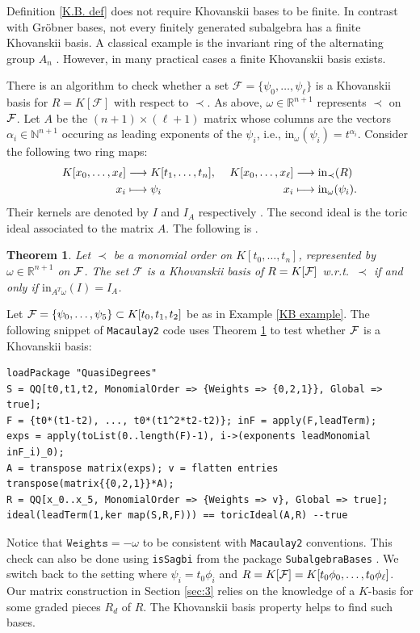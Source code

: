 \documentclass[12pt]{article}
\newtheorem{thm}{Theorem}[section]
\theoremstyle{definition}
\newenvironment{example}
  {\pushQED{\qed}\renewcommand{\qedsymbol}{$\diamond$}\examplex}
  {\popQED\endexamplex}
\theoremstyle{remark}
\newcommand{\numberset}{\mathbb}
\newcommand{\N}{\numberset{N}}
\def\initial{{\mathrm{in}}}
\begin{document}
Definition \ref{K.B. def} does not require Khovanskii bases to be finite. In contrast with Gr\"obner bases, not every finitely generated subalgebra has a finite Khovanskii basis. A classical example is the invariant ring of the alternating group $A_n$ \cite[Example 11.2]{sturmfelsgroebner}. However, in many practical cases a finite Khovanskii basis exists. 

There is an algorithm to check whether a set $\mathcal{F}=\{\psi_0,\ldots, \psi_\ell \}$ is a Khovanskii basis for $R=K[\mathcal{F}]$ with respect to $\prec$. As above, $\omega \in \mathbb{R}^{n+1}$ represents $\prec$ on ${\cal F}$. Let $A$ be the $(n+1) \times (\ell+1)$ matrix whose columns are the vectors $\alpha_i\in \N^{n+1}$ occuring as leading exponents of the $\psi_i$, i.e., $\initial_\omega{(\psi_i)}=t^{\alpha_i}$. Consider the following two ring maps:
\[ \begin{aligned}
 K[x_0,\dots, x_\ell]&\longrightarrow K[t_1,\dots,t_n], \ &K[x_0,\dots,x_\ell]&\longrightarrow {\rm in}_\prec(R) \\
x_i&\longmapsto \psi_i & x_i&\longmapsto \initial_\omega{(\psi_i)}.
\end{aligned}\]
Their kernels are denoted by $I$ and $I_A$ respectively . The second ideal is the toric ideal associated to the matrix $A$.
The following is {\cite[Theorem~11.4]{sturmfelsgroebner}}.
\begin{thm} \label{thm:khovcheck}
Let $\prec$ be a monomial order on $K[t_0,\dots,t_n]$, represented by $\omega \in \mathbb{R}^{n+1}$ on ${\cal F}$. The set $\mathcal{F}$ is a Khovanskii basis of $R = K[{\cal F}]$ w.r.t.~$\prec$ if and only if $\initial_{A^T\omega}{(I)}=I_A$.
\end{thm}
\begin{example} \label{ex:Khovcheck}
Let ${\cal F} = \{ \psi_0, \ldots, \psi_5 \} \subset K[t_0, t_1, t_2]$ be as in Example \ref{KB example}. The following snippet of \texttt{Macaulay2} code uses Theorem \ref{thm:khovcheck} to test whether ${\cal F}$ is a Khovanskii basis:
\begin{verbatim}
loadPackage "QuasiDegrees"
S = QQ[t0,t1,t2, MonomialOrder => {Weights => {0,2,1}}, Global => true];
F = {t0*(t1-t2), ..., t0*(t1^2*t2-t2)}; inF = apply(F,leadTerm);
exps = apply(toList(0..length(F)-1), i->(exponents leadMonomial inF_i)_0);
A = transpose matrix(exps); v = flatten entries transpose(matrix{{0,2,1}}*A);  
R = QQ[x_0..x_5, MonomialOrder => {Weights => v}, Global => true];
ideal(leadTerm(1,ker map(S,R,F))) == toricIdeal(A,R) --true
\end{verbatim}
\normalsize
Notice that $\mathtt{Weights} = -\omega$ to be consistent with \texttt{Macaulay2} conventions. This check can also be done using \texttt{isSagbi} from the package \texttt{SubalgebraBases} \cite{burr2023subalgebrabases}. 
\end{example}
We switch back to the setting where $\psi_i = t_0 \phi_i$ and $R = K[{\cal F}] = K[t_0 \phi_0, \ldots, t_0\phi_\ell]$. Our matrix construction in Section \ref{sec:3} relies on the knowledge of a $K$-basis for some graded pieces $R_d$ of $R$. The Khovanskii basis property helps to find such bases. 
\end{document}
